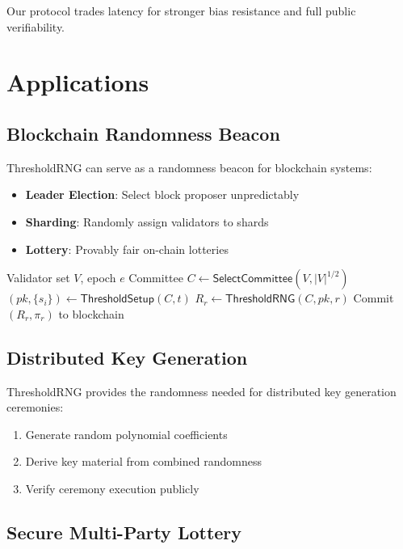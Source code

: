 \documentclass[11pt,a4paper]{article}
\begin{document}
Our protocol trades latency for stronger bias resistance and full public verifiability.

\section{Applications}

\subsection{Blockchain Randomness Beacon}

ThresholdRNG can serve as a randomness beacon for blockchain systems:

\begin{itemize}
    \item \textbf{Leader Election}: Select block proposer unpredictably
    \item \textbf{Sharding}: Randomly assign validators to shards
    \item \textbf{Lottery}: Provably fair on-chain lotteries
\end{itemize}

\begin{algorithm}
\caption{Blockchain Integration}
\begin{algorithmic}[1]
\Require Validator set $V$, epoch $e$
\State Committee $C \gets \textsf{SelectCommittee}(V, |V|^{1/2})$
\State $(pk, \{s_i\}) \gets \textsf{ThresholdSetup}(C, t)$
    \State $R_r \gets \textsf{ThresholdRNG}(C, pk, r)$
    \State Commit $(R_r, \pi_r)$ to blockchain
\EndFor
\end{algorithmic}
\end{algorithm}

\subsection{Distributed Key Generation}

ThresholdRNG provides the randomness needed for distributed key generation ceremonies:

\begin{enumerate}
    \item Generate random polynomial coefficients
    \item Derive key material from combined randomness
    \item Verify ceremony execution publicly
\end{enumerate}

\subsection{Secure Multi-Party Lottery}
\end{document}
